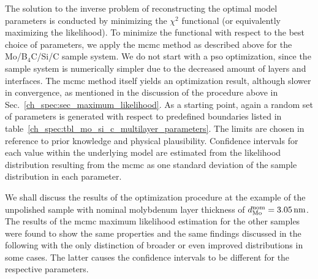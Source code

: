 The solution to the inverse problem of reconstructing the optimal model parameters is conducted by minimizing  the $\chi^2$ functional (or equivalently maximizing the likelihood). To minimize the functional with respect to the best choice of parameters, we apply the \gls{mcmc} method as described above for the Mo/B$_4$C/Si/C sample system. We do not start with a \gls{pso} optimization, since the sample system is numerically simpler due to the decreased amount of layers and interfaces. The \gls{mcmc} method itself yields an optimization result, although slower in convergence, as mentioned in the discussion of the procedure above in Sec.~\ref{ch_spec:sec_maximum_likelihood}. As a starting point, again a random set of parameters is generated with respect to predefined boundaries listed in table~\ref{ch_spec:tbl_mo_si_c_multilayer_parameters}. The limits are chosen in reference to prior knowledge and physical plausibility. Confidence intervals for each value within the underlying model are estimated from the likelihood distribution resulting from the \gls{mcmc} as one standard deviation of the sample distribution in each parameter.

We shall discuss the results of the optimization procedure at the example of the unpolished sample with nominal molybdenum layer thickness of $d_\text{Mo}^\text{nom} = \nm{3.05}$. The results of the \gls{mcmc} maximum likelihood estimation for the other samples were found to show the same properties and the same findings discussed in the following with the only distinction of broader or even improved distributions in some cases. The latter causes the confidence intervals to be different for the respective parameters.

